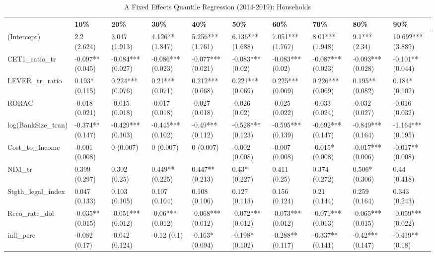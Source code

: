 \begin{table}[ht]
\centering
\caption{A Fixed Effects Quantile Regression (2014-2019): Households} 
\begingroup\small
\begin{tabular}{llllllllll}
  \toprule
 & 10\% & 20\% & 30\% & 40\% & 50\% & 60\% & 70\% & 80\% & 90\% \\ 
  \midrule
(Intercept) & 2.2 (2.624) & 3.047 (1.913) & 4.126** (1.847) & 5.256*** (1.761) & 6.136*** (1.688) & 7.051*** (1.767) & 8.01*** (1.948) & 9.1*** (2.34) & 10.692*** (3.889) \\ 
  CET1\_ratio\_tr & -0.097** (0.045) & -0.084*** (0.027) & -0.086*** (0.023) & -0.077*** (0.021) & -0.083*** (0.02) & -0.083*** (0.02) & -0.087*** (0.023) & -0.093*** (0.028) & -0.101** (0.044) \\ 
  LEVER\_tr\_ratio & 0.193* (0.115) & 0.224*** (0.076) & 0.21*** (0.071) & 0.212*** (0.068) & 0.221*** (0.069) & 0.225*** (0.069) & 0.226*** (0.069) & 0.195** (0.082) & 0.184* (0.102) \\ 
  RORAC & -0.018 (0.021) & -0.015 (0.018) & -0.017 (0.018) & -0.027 (0.018) & -0.026 (0.02) & -0.025 (0.022) & -0.033 (0.024) & -0.032 (0.027) & -0.016 (0.032) \\ 
  log(BankSize\_tran) & -0.374** (0.147) & -0.429*** (0.103) & -0.445*** (0.102) & -0.49*** (0.112) & -0.528*** (0.123) & -0.595*** (0.139) & -0.692*** (0.147) & -0.849*** (0.164) & -1.164*** (0.195) \\ 
  Cost\_to\_Income & -0.001 (0.008) & 0 (0.007) & 0 (0.007) & 0 (0.007) & -0.002 (0.008) & -0.007 (0.008) & -0.015* (0.008) & -0.017*** (0.006) & -0.017** (0.008) \\ 
  NIM\_tr & 0.399 (0.297) & 0.302 (0.25) & 0.449** (0.225) & 0.447** (0.213) & 0.43* (0.227) & 0.411 (0.25) & 0.374 (0.272) & 0.506* (0.306) & 0.44 (0.418) \\ 
  Stgth\_legal\_index & 0.047 (0.133) & 0.103 (0.105) & 0.107 (0.104) & 0.108 (0.106) & 0.127 (0.113) & 0.156 (0.124) & 0.21 (0.144) & 0.259 (0.164) & 0.343 (0.243) \\ 
  Reco\_rate\_dol & -0.035** (0.015) & -0.051*** (0.012) & -0.06*** (0.012) & -0.068*** (0.012) & -0.072*** (0.012) & -0.073*** (0.012) & -0.071*** (0.013) & -0.065*** (0.015) & -0.059*** (0.022) \\ 
  infl\_perc & -0.082 (0.17) & -0.042 (0.124) & -0.12 (0.1) & -0.163* (0.094) & -0.198* (0.102) & -0.288** (0.117) & -0.337** (0.141) & -0.42*** (0.147) & -0.419** (0.18) \\ 

\end{tabular}
\end{table}
